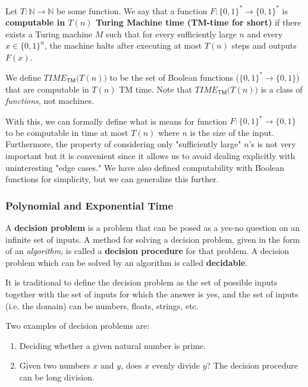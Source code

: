  \begin{definition}
  Let $T: \mathbb{N} \longrightarrow \mathbb{N}$ be some function. We say that a function $F: \{0,1\}^* \longrightarrow \{0,1\}^*$ is \textbf{computable in $T(n)$ Turing Machine time (TM-time for short)} if there exists a Turing machine $M$ such that for every sufficiently large $n$ and every $x \in \{0,1\}^n$, the machine halts after executing at most $T(n)$ steps and outputs $F(x)$. 

  We define $TIME_{\mathsf{TM}}\big(T(n)\big)$ to be the set of Boolean functions ($\{0,1\}^* \longrightarrow \{0,1\}$) that are computable in $T(n)$ TM time. Note that $TIME_{\mathsf{TM}}\big(T(n)\big)$ is a class of \textit{functions}, not machines. 
  \end{definition}

  With this, we can formally define what is means for function $F: \{0,1\}^* \longrightarrow \{0,1\}$ to be computable in time at most $T(n)$ where $n$ is the size of the input. Furthermore, the property of considering only "sufficiently large" $n$'s is not very important but it is convenient since it allows us to avoid dealing explicitly with uninteresting "edge cases." We have also defined computability with Boolean functions for simplicity, but we can generalize this further. 

\subsubsection{Polynomial and Exponential Time}

  \begin{definition}
    A \textbf{decision problem} is a problem that can be posed as a yes-no question on an infinite set of inputs. A method for solving a decision problem, given in the form of an \textit{algorithm}, is called a \textbf{decision procedure} for that problem. A decision problem which can be solved by an algorithm is called \textbf{decidable}. 
  \end{definition}

  It is traditional to define the decision problem as the set of possible inputs together with the set of inputs for which the answer is yes, and the set of inputs (i.e. the domain) can be numbers, floats, strings, etc. 

  \begin{example}
    Two examples of decision problems are: 
    \begin{enumerate}
      \item Deciding whether a given natural number is prime. 
      \item Given two numbers $x$ and $y$, does $x$ evenly divide $y$? The decision procedure can be long division. 
    \end{enumerate}
  \end{example}

